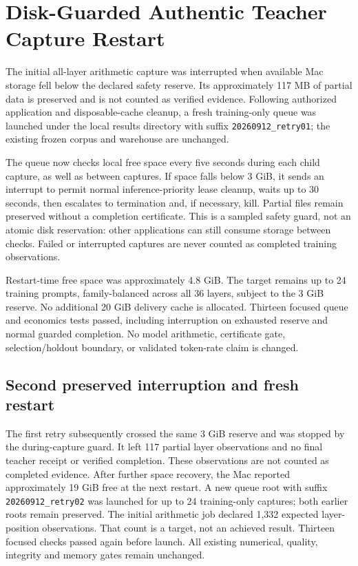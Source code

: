 \section{Disk-Guarded Authentic Teacher Capture Restart}
The initial all-layer arithmetic capture was interrupted when available Mac
storage fell below the declared safety reserve. Its approximately 117 MB of
partial data is preserved and is not counted as verified evidence. Following
authorized application and disposable-cache cleanup, a fresh training-only
queue was launched under the local results directory with suffix
\texttt{20260912\_retry01}; the existing frozen corpus and warehouse are unchanged.

The queue now checks local free space every five seconds during each child
capture, as well as between captures. If space falls below 3 GiB, it sends an
interrupt to permit normal inference-priority lease cleanup, waits up to
30 seconds, then escalates to termination and, if necessary, kill. Partial
files remain preserved without a completion certificate. This is a sampled
safety guard, not an atomic disk reservation: other applications can still
consume storage between checks. Failed or interrupted captures are never
counted as completed training observations.

Restart-time free space was approximately 4.8 GiB. The target remains up to
24 training prompts, family-balanced across all 36 layers, subject to the
3 GiB reserve. No additional 20 GiB delivery cache is allocated. Thirteen
focused queue and economics tests passed, including interruption on exhausted
reserve and normal guarded completion. No model arithmetic, certificate gate,
selection/holdout boundary, or validated token-rate claim is changed.

\subsection{Second preserved interruption and fresh restart}
The first retry subsequently crossed the same 3 GiB reserve and was stopped
by the during-capture guard. It left 117 partial layer observations and no
final teacher receipt or verified completion. These observations are not
counted as completed evidence. After further space recovery, the Mac reported
approximately 19 GiB free at the next restart. A new queue root with suffix
\texttt{20260912\_retry02} was launched for up to 24 training-only captures;
both earlier roots remain preserved. The initial arithmetic job declared
1,332 expected layer-position observations. That count is a target, not an
achieved result. Thirteen focused checks passed again before launch. All
existing numerical, quality, integrity and memory gates remain unchanged.
